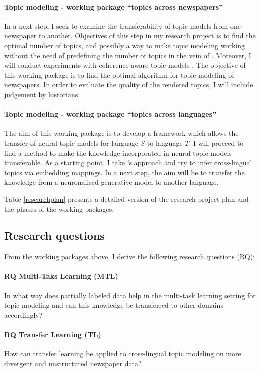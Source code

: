 \paragraph{Topic modeling - working package ``topics across newspapers''} In a next step, I seek to examine the transferability of topic models from one newspaper to another. Objectives of this step in my research project is to find the optimal number of topics, and possibly a way to make topic modeling working without the need of predefining the number of topics in the vein of \citet{miao_neural_2016}. Moreover, I will conduct experiments with coherence aware topic models \citep{2018arXiv180902687D}. The objective of this working package is to find the optimal algorithm for topic modeling of newspapers. In order to evaluate the quality of the rendered topics, I will include judgement by historians. 

\paragraph{Topic modeling - working package ``topics across languages''} The aim of this working package is to develop a framework which allows the transfer of neural topic models for language $S$ to language $T$. I will proceed to find a method to make the knowledge incorporated in neural topic models transferable. As a starting point, I take \citet{Moody16}'s approach and try to infer cross-lingual topics via embedding mappings. In a next step, the aim will be to transfer the knowledge from a neuronalised generative model to another language.

Table \ref{researchplan} presents a detailed version of the research project plan and the phases of the working packages.

\subsection{Research questions}
From the working packages above, I derive the following research questions (RQ):

\paragraph{RQ Multi-Taks Learning (MTL)} In what way does partially labeled data help in the multi-task learning setting for topic modeling and can this knowledge be transferred  to other domains accordingly?

\paragraph{RQ Transfer Learning (TL)} How can transfer learning be applied to cross-lingual topic modeling on more divergent and unstructured newspaper data?

